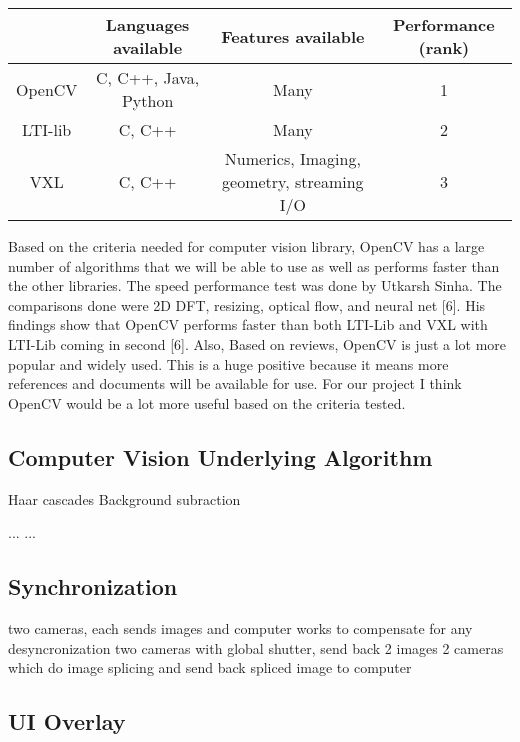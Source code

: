 \documentclass[letterpaper,10pt,onecolumn,draftclsnofoot]{IEEEtran}
\begin{document}
\begin{center}
	\begin{tabular}{|c|c|c|c|}
		
		\hline
		\textbf{} & \textbf{Languages available} & \textbf{Features available} & \textbf{Performance (rank)} \\
		\hline
		OpenCV & C, C++, Java, Python & Many & 1 \\
		\hline
		LTI-lib & C, C++ & Many & 2 \\
		\hline
		VXL & C, C++ & Numerics, Imaging, geometry, streaming I/O & 3 \\
		\hline
		
	\end{tabular}
\end{center}

Based on the criteria needed for computer vision library, OpenCV has a large number of algorithms that we will be able to use as well as performs faster than the other libraries.
The speed performance test was done by Utkarsh Sinha.
The comparisons done were 2D DFT, resizing, optical flow, and neural net [6].
His findings show that OpenCV performs faster than both LTI-Lib and VXL with LTI-Lib coming in second [6].
Also, Based on reviews, OpenCV is just a lot more popular and widely used.
This is a huge positive because it means more references and documents will be available for use.
For our project I think OpenCV would be a lot more useful based on the criteria tested.

\newpage
\subsection{Computer Vision Underlying Algorithm} %

Haar cascades
Background subraction

...
...

\newpage
\subsection{Synchronization} %

two cameras, each sends images and computer works to compensate for any desyncronization
two cameras with global shutter, send back 2 images
2 cameras which do image splicing and send back spliced image to computer

\newpage
\subsection{UI Overlay} %
\end{document}
